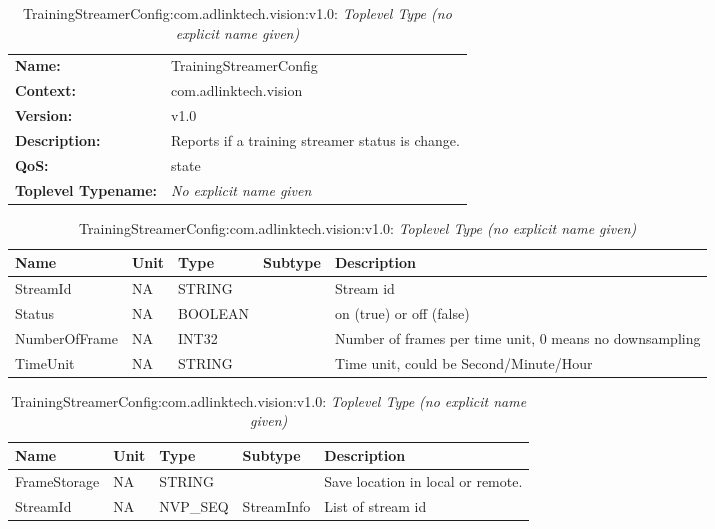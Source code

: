 \begin{table}[H]
\begin{tabularx}{\textwidth}{l X} 
       \textbf{Name:} & TrainingStreamerConfig \\ 
	   \textbf{Context:} & com.adlinktech.vision \\ 
	   \textbf{Version:} & v1.0 \\ 
	   \textbf{Description:} & Reports if a training streamer status is change. \\ 
	   \textbf{QoS:} & state \\
	   \textbf{Toplevel Typename:} & \textit{No explicit name given} \\ 
\end{tabularx}
\caption{TrainingStreamerConfig:com.adlinktech.vision:v1.0}\label{TrainingStreamerConfigTagGroup.json:table:TrainingStreamerConfig}
\bigskip
\begin{tabularx}{\textwidth}{l l l l X} 
	 \textbf{Name} & \textbf{Unit} & \textbf{Type} & \textbf{Subtype} & \textbf{Description} \\
	 \midrule
   StreamId & NA & STRING &  & Stream id \\
   Status & NA & BOOLEAN &  & on (true) or off (false) \\
   NumberOfFrame & NA & INT32 &  & Number of frames per time unit, 0 means no downsampling \\
   TimeUnit & NA & STRING &  & Time unit, could be Second/Minute/Hour \\
\end{tabularx}
\caption{TrainingStreamerConfig:com.adlinktech.vision:v1.0: StreamInfo}\label{TrainingStreamerConfigTagGroup.json:table:TrainingStreamerConfig-StreamInfo}

\bigskip
\begin{tabularx}{\textwidth}{l l l l X} 
	 \textbf{Name} & \textbf{Unit} & \textbf{Type} & \textbf{Subtype} & \textbf{Description} \\
	 \midrule
   FrameStorage & NA & STRING &  & Save location in local or remote. \\
   StreamId & NA & NVP\_SEQ & StreamInfo & List of stream id \\
\end{tabularx}
\caption{TrainingStreamerConfig:com.adlinktech.vision:v1.0: \textit{Toplevel Type (no explicit name given)}}\label{TrainingStreamerConfigTagGroup.json:table:TrainingStreamerConfig-no-type-given}


\end{table}

